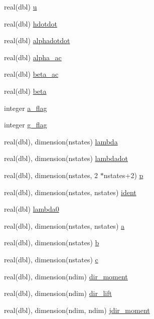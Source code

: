 \begin{DoxyCompactItemize}
\item 
real(dbl) \hyperlink{namespaceelement_a6d48ee96f674959ef1225a3730fcf3e7}{u}
\item 
real(dbl) \hyperlink{namespaceelement_a012a2b1125e535b957a6be4ea842da6d}{hdotdot}
\item 
real(dbl) \hyperlink{namespaceelement_a3b4df4c1043c9ebd56f5d23ca24d00ac}{alphadotdot}
\item 
real(dbl) \hyperlink{namespaceelement_aab90697519f32a9a4f56786465c1bd0b}{alpha\+\_\+ac}
\item 
real(dbl) \hyperlink{namespaceelement_a9ab0720aafb3053cad927fc402be3000}{beta\+\_\+ac}
\item 
real(dbl) \hyperlink{namespaceelement_a1ea3f00156313fce1a3de0a00499702c}{beta}
\item 
integer \hyperlink{namespaceelement_a17661475127df7ce4d09fb1e942cbd58}{a\+\_\+flag}
\item 
integer \hyperlink{namespaceelement_a4f9b46e901684a30dec91ad363247dd3}{g\+\_\+flag}
\item 
real(dbl), dimension(nstates) \hyperlink{namespaceelement_abfc6a3777c98caf9d75aa0fa4ce97e17}{lambda}
\item 
real(dbl), dimension(nstates) \hyperlink{namespaceelement_a627873fe5856f3a9c95039d8f6877039}{lambdadot}
\item 
real(dbl), dimension(nstates, 2 $\ast$nstates+2) \hyperlink{namespaceelement_abf487a07f5188539bf21883fc0a10c70}{p}
\item 
real(dbl), dimension(nstates, nstates) \hyperlink{namespaceelement_af575d84cfbaeca87aec268f375efac06}{ident}
\item 
real(dbl) \hyperlink{namespaceelement_aa9695f47555869b8d547d0d87d49275e}{lambda0}
\item 
real(dbl), dimension(nstates, nstates) \hyperlink{namespaceelement_ad0c7d68510d195a504efc593e729263f}{a}
\item 
real(dbl), dimension(nstates) \hyperlink{namespaceelement_a031bf1cdfa87524ec1b508c44f537002}{b}
\item 
real(dbl), dimension(nstates) \hyperlink{namespaceelement_a1203577a202409830d687bf3b68c621e}{c}
\item 
real(dbl), dimension(ndim) \hyperlink{namespaceelement_a88c83da354d518bfd81c3ef7691b4682}{dir\+\_\+moment}
\item 
real(dbl), dimension(ndim) \hyperlink{namespaceelement_a10ce0718ec68d00dd9fab0c290410366}{dir\+\_\+lift}
\item 
real(dbl), dimension(ndim, ndim) \hyperlink{namespaceelement_a1dcc074ceaab61da55e1b1964ea3d235}{jdir\+\_\+moment}

\end{DoxyCompactItemize}
